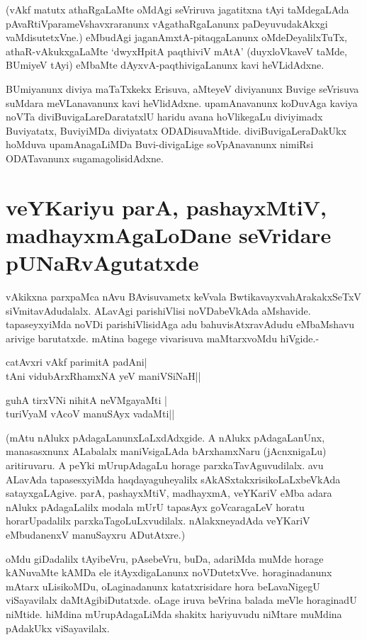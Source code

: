 (vAkf matutx athaRgaLaMte oMdAgi seVriruva jagatitxna tAyi taMdegaLAda pAvaRtiVparameVshavxraranunx vAgathaRgaLanunx paDeyuvudakAkxgi vaMdisutetxVne.) eMbudAgi jaganAmxtA-pitaqgaLanunx oMdeDeyalilxTuTx, athaR-vAkukxgaLaMte `dwyxHpitA paqthiviV mAtA'\label{21} (duyxloVkaveV taMde, BUmiyeV tAyi) eMbaMte dAyxvA-paqthivigaLanunx kavi heVLidAdxne.

BUmiyanunx diviya maTaTxkekx  Erisuva, aMteyeV diviyanunx Buvige seVrisuva suMdara meVLanavanunx kavi heVlidAdxne. upamAnavanunx koDuvAga kaviya noVTa diviBuvigaLareDaratatxlU haridu avana hoVlikegaLu diviyimadx Buviyatatx, BuviyiMDa diviyatatx ODADisuvaMtide. diviBuvigaLeraDakUkx hoMduva upamAnagaLiMDa Buvi-divigaLige soVpAnavanunx  nimiRsi ODATavanunx sugamagolisidAdxne.

\section*{veYKariyu parA, pashayxMtiV, madhayxmAgaLoDane seVridare pUNaRvAgutatxde}

vAkikxna parxpaMca nAvu BAvisuvametx keVvala BwtikavayxvahArakakxSeTxV siVmitavAdudalalx. ALavAgi parishiVlisi noVDabeVkAda aMshavide. tapaseyxyiMda noVDi parishiVlisidAga adu bahuvisAtxravAdudu eMbaMshavu arivige barutatxde. mAtina bagege vivarisuva maMtarxvoMdu hiVgide.-

\begin{shloka}
catAvxri vAkf parimitA padAni|\label{22}\\
tAni vidubArxRhamxNA yeV maniVSiNaH||
\end{shloka}

\begin{shloka}
guhA tirxVNi nihitA neVMgayaMti |\\
turiVyaM vAcoV manuSAyx vadaMti||
\end{shloka}

(mAtu nAlukx pAdagaLanunxLaLxdAdxgide. A nAlukx  pAdagaLanUnx, manasasxnunx ALabalalx maniVsigaLAda bArxhamxNaru (jAcnxnigaLu) aritiruvaru. A peYki mUrupAdagaLu horage parxkaTavAguvudilalx. avu ALavAda tapasesxyiMda haqdayaguheyalilx sAkASxtakxrisikoLaLxbeVkAda satayxgaLAgive. parA, pashayxMtiV, madhayxmA, veYKariV eMba adara nAlukx  pAdagaLalilx modala mUrU tapasAyx goVcaragaLeV horatu horarUpadalilx parxkaTagoLuLxvudilalx. nAlakxneyadAda veYKariV eMbudanenxV manuSayxru ADutAtxre.)

oMdu giDadalilx tAyibeVru, pAsebeVru, buDa, adariMda muMde horage kANuvaMte kAMDa ele itAyxdigaLanunx noVDutetxVve. horaginadanunx mAtarx uLisikoMDu, oLaginadanunx katatxrisidare hora beLavaNigegU viSayavilalx daMtAgibiDutatxde. oLage iruva beVrina balada meVle horaginadU niMtide. hiMdina mUrupAdagaLiMda shakitx hariyuvudu niMtare muMdina pAdakUkx  viSayavilalx.

